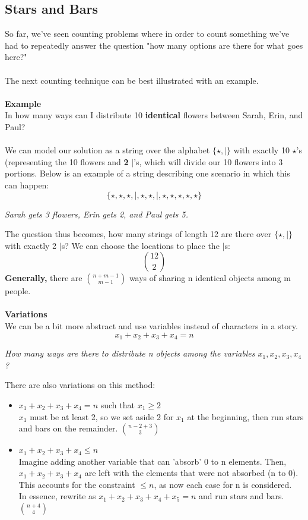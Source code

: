 \documentclass[12pt]{article}
\begin{document}
	\subsection{Stars and Bars}
	So far, we've seen counting problems where in order to count something we've had to repeatedly answer the question "how many options are there for what goes here?"\\\\
	The next counting technique can be best illustrated with an example.\\\\
	\textbf{Example}\\
	In how many ways can I distribute 10 \textbf{identical} flowers between Sarah, Erin, and Paul?\\\\
	We can model our solution as a string over the alphabet $\{\star, \vert\}$ with exactly 10 $\star$'s (representing the 10 flowers and \textbf{2} $\vert$'s, which will divide our 10 flowers into 3 portions. Below is an example of a string describing one scenario in which this can happen:
	$$\{\star, \star, \star, \vert, \star, \star, \vert, \star, \star, \star, \star, \star\}$$
	\begin{center}
		\textit{Sarah gets 3 flowers, Erin gets 2, and Paul gets 5.}
	\end{center}
	The question thus becomes, how many strings of length 12 are there over $\{\star, \vert\}$ with exactly 2 $\vert$s? We can choose the locations to place the $\vert$s:
	$${12 \choose 2}$$
	\textbf{Generally,} there are ${n + m - 1 \choose m - 1}$ ways of sharing n identical objects among m people.\\\\
	\textbf{Variations}\\
	We can be a bit more abstract and use variables instead of characters in a story.
	$$x_1 + x_2 + x_3 + x_4 = n$$
	\begin{center}
		\textit{How many ways are there to distribute n objects among the variables $x_1, x_2, x_3, x_4$?}
	\end{center}
	There are also variations on this method:
	\begin{itemize}
		\item $x_1 + x_2 + x_3 + x_4 = n$ such that $x_1 \geq 2$ \\
			$x_1$ must be at least 2, so we set aside 2 for $x_1$ at the beginning, then run stars and bars on the remainder. ${n - 2 + 3 \choose 3}$
		\item $x_1 + x_2 + x_3 + x_4 \leq n$ \\
			Imagine adding another variable that can 'absorb' 0 to n elements. Then, $x_1 + x_2 + x_3 + x_4$ are left with the elements that were not absorbed (n to 0). This accounts for the constraint $\leq n$, as now each case for n is considered. \\
			In essence, rewrite as $x_1 + x_2 + x_3 + x_4 + x_5 = n$ and run stars and bars. ${n + 4 \choose 4}$
	\end{itemize}
	\noindent
\end{document}
